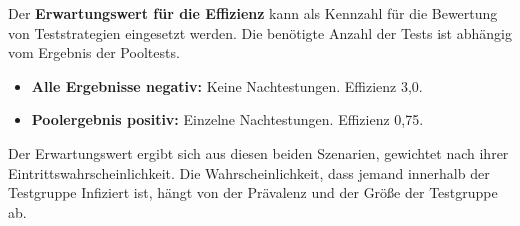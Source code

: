 Der \textbf{Erwartungswert für die Effizienz} kann als Kennzahl für die Bewertung von Teststrategien eingesetzt werden.
Die benötigte Anzahl der Tests ist abhängig vom Ergebnis der Pooltests.
\begin{itemize}
	\item \textbf{Alle Ergebnisse negativ:} Keine Nachtestungen. Effizienz 3,0. 
	\item \textbf{Poolergebnis positiv:} Einzelne Nachtestungen. Effizienz 0,75.
\end{itemize}
Der Erwartungswert ergibt sich aus diesen beiden Szenarien, gewichtet nach ihrer Eintrittswahrscheinlichkeit.
Die Wahrscheinlichkeit, dass jemand innerhalb der Testgruppe Infiziert ist, hängt von der Prävalenz und der Größe der Testgruppe ab.
\cleardoublepage
